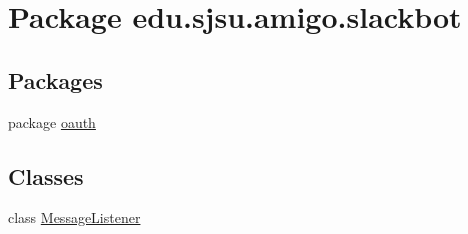 \hypertarget{namespaceedu_1_1sjsu_1_1amigo_1_1slackbot}{}\section{Package edu.\+sjsu.\+amigo.\+slackbot}
\label{namespaceedu_1_1sjsu_1_1amigo_1_1slackbot}
\subsection*{Packages}
\begin{DoxyCompactItemize}
\item 
package \hyperlink{namespaceedu_1_1sjsu_1_1amigo_1_1slackbot_1_1oauth}{oauth}
\end{DoxyCompactItemize}
\subsection*{Classes}
\begin{DoxyCompactItemize}
\item 
class \hyperlink{classedu_1_1sjsu_1_1amigo_1_1slackbot_1_1_message_listener}{Message\+Listener}
\end{DoxyCompactItemize}
